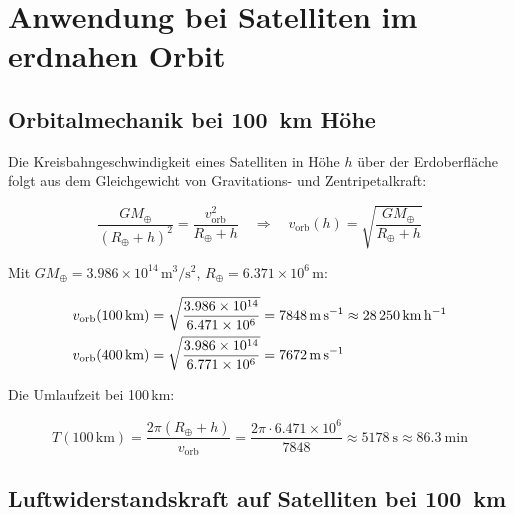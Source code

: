 ﻿\documentclass[12pt, a4paper]{report}
\theoremstyle{definition}
\theoremstyle{remark}
\begin{document}
\chapter{Anwendung bei Satelliten im erdnahen Orbit}
\label{chap:satellit}

\section{Orbitalmechanik bei \SI{100}{\kilo\metre} Höhe}

Die Kreisbahngeschwindigkeit eines Satelliten in Höhe $h$ über der Erdoberfläche
folgt aus dem Gleichgewicht von Gravitations- und Zentripetalkraft:

\begin{equation}
  \frac{GM_\oplus}{(R_\oplus + h)^2} = \frac{v_{\text{orb}}^2}{R_\oplus + h}
  \quad\Rightarrow\quad
  v_{\text{orb}}(h) = \sqrt{\frac{GM_\oplus}{R_\oplus + h}}
  \label{eq:v_orb}
\end{equation}

Mit $GM_\oplus = 3.986 \times 10^{14}\,\text{m}^3/\text{s}^2$,
$R_\oplus = 6.371 \times 10^6\,\text{m}$:

\begin{align}
  v_{\text{orb}}(100\,\text{km}) &= \sqrt{\frac{3.986 \times 10^{14}}{6.471 \times 10^6}}
  = \SI{7\,848}{\metre\per\second} \approx \SI{28\,250}{\kilo\metre\per\hour}
  \label{eq:v100km} \\
  v_{\text{orb}}(400\,\text{km}) &= \sqrt{\frac{3.986 \times 10^{14}}{6.771 \times 10^6}}
  = \SI{7\,672}{\metre\per\second}
  \label{eq:v400km}
\end{align}

Die Umlaufzeit bei 100\,km:

\begin{equation}
  T(100\,\text{km}) = \frac{2\pi(R_\oplus + h)}{v_{\text{orb}}} =
  \frac{2\pi \cdot 6.471 \times 10^6}{7848}
  \approx \SI{5178}{\second} \approx \SI{86.3}{\minute}
  \label{eq:t_orb}
\end{equation}

\section{Luftwiderstandskraft auf Satelliten bei \SI{100}{\kilo\metre}}
\end{document}
